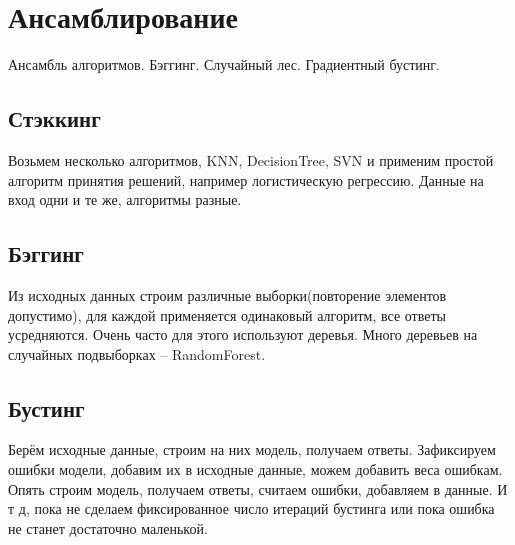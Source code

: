 \section{Ансамблирование}
Ансамбль алгоритмов. Бэггинг. Случайный лес. Градиентный бустинг.

\subsection{Стэккинг}
Возьмем несколько алгоритмов, KNN, DecisionTree, SVN и применим простой алгоритм принятия решений, например логистическую регрессию. Данные на вход одни и те же, алгоритмы разные.

\subsection{Бэггинг}
Из исходных данных строим различные выборки(повторение элементов допустимо), для каждой применяется одинаковый алгоритм, все ответы усредняются. Очень часто для этого используют деревья. Много деревьев на случайных подвыборках -- RandomForest.

\subsection{Бустинг}
Берём исходные данные, строим на них модель, получаем ответы. Зафиксируем ошибки модели, добавим их в исходные данные, можем добавить веса ошибкам. Опять строим модель, получаем ответы, считаем ошибки, добавляем в данные. И т д, пока не сделаем фиксированное число итераций бустинга или пока ошибка не станет достаточно маленькой.